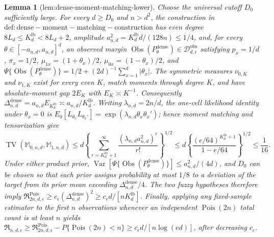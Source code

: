 \documentclass{article}
\newtheorem{lemma}{Lemma}
\begin{document}
\begin{lemma}[lem:dense-moment-matching-lower]\label{lem:dense-moment-matching-lower}
Choose the universal cutoff \(D_0\) sufficiently large.  For every \(d\geq D_0\) and \(n>d^2\), the construction in \(\mathrm{def:dense-moment-matching-construction}\) has even degree \(8L_d\leq K_d^{\mathrm{lb}}<8L_d+2\), amplitude \(a_{n,d}^2=K_d^{\mathrm{lb}}d/(128n)\leq1/4\), and, for every \(\theta\in[-a_{n,d},a_{n,d}]^d\), an observed margin \(\operatorname{Obs}(P_\theta^{\mathrm{dense}})\in\mathcal D_{d,\epsilon}^{\mathrm{obs}}\) satisfying \(p_x=1/d\), \(\pi_x=1/2\), \(\mu_{1x}=(1+\theta_x)/2\), \(\mu_{0x}=(1-\theta_x)/2\), and \(\Psi\{\operatorname{Obs}(P_\theta^{\mathrm{dense}})\}=1/2+(2d)^{-1}\sum_{x=1}^d\lvert\theta_x\rvert\).  The symmetric measures \(\nu_{0,K}\) and \(\nu_{1,K}\) exist for every even \(K\), match moments through degree \(K\), and have absolute-moment gap \(2E_K\) with \(E_K\asymp K^{-1}\).  Consequently \(\Delta_{n,d}^{\mathrm{dense}}=a_{n,d}E_{K_d^{\mathrm{lb}}}\asymp a_{n,d}/K_d^{\mathrm{lb}}\).  Writing \(\lambda_{n,d}=2n/d\), the one-cell likelihood identity under \(\theta_x=0\) is \(E_0[L_{\theta_x}L_{\theta_x'}]=\exp(\lambda_{n,d}\theta_x\theta_x')\); hence moment matching and tensorization give
\[
\operatorname{TV}(\mathbb M_{0,n,d},\mathbb M_{1,n,d})
\leq d\left\{\sum_{r=K_d^{\mathrm{lb}}+1}^{\infty}\frac{(\lambda_{n,d}a_{n,d}^2)^r}{r!}\right\}^{1/2}
\leq d\left\{\frac{(e/64)^{K_d^{\mathrm{lb}}+1}}{1-e/64}\right\}^{1/2}\leq\frac1{16}.
\]
Under either product prior, \(\operatorname{Var}[\Psi\{\operatorname{Obs}(P_\theta^{\mathrm{dense}})\}]\leq a_{n,d}^2/(4d)\), and \(D_0\) can be chosen so that each prior assigns probability at most \(1/8\) to a deviation of the target from its prior mean exceeding \(\Delta_{n,d}^{\mathrm{dense}}/4\).  The two fuzzy hypotheses therefore imply \(\mathfrak R^{\mathrm{Pois}}_{2n,d,\epsilon}\geq c_\epsilon(\Delta_{n,d}^{\mathrm{dense}})^2\geq c_\epsilon d/[nK_d^{\mathrm{lb}}]\).  Finally, applying any fixed-sample estimator to the first \(n\) observations whenever an independent \(\operatorname{Pois}(2n)\) total count is at least \(n\) yields \(\mathfrak R_{n,d,\epsilon}\geq\mathfrak R^{\mathrm{Pois}}_{2n,d,\epsilon}-P\{\operatorname{Pois}(2n)<n\}\geq c_\epsilon d/[n\log(ed)]\), after decreasing \(c_\epsilon\).
\end{lemma}
\end{document}
